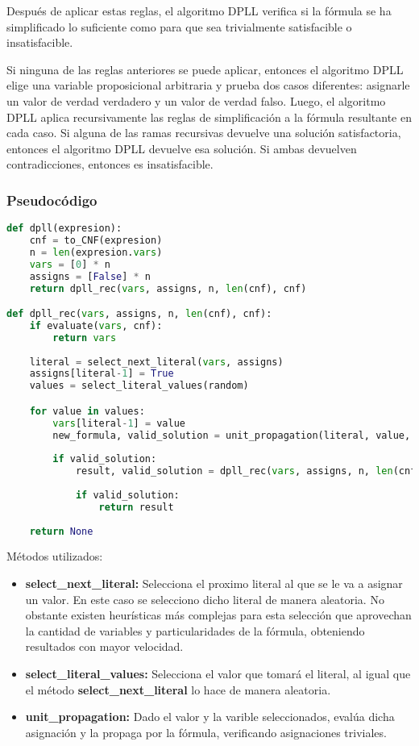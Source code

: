 \documentclass{article}
\begin{document}
        Después de aplicar estas reglas, el algoritmo DPLL verifica si la fórmula se ha simplificado lo suficiente como para que sea 
        trivialmente satisfacible o insatisfacible.  

        Si ninguna de las reglas anteriores se puede aplicar, entonces el algoritmo DPLL elige una variable proposicional 
        arbitraria y prueba dos casos diferentes: asignarle un valor de verdad verdadero y un valor de verdad falso.
        Luego, el algoritmo DPLL aplica recursivamente las reglas de simplificación a la fórmula resultante en cada caso. 
        Si alguna de las ramas recursivas devuelve una solución satisfactoria, entonces el algoritmo DPLL devuelve esa solución.
        Si ambas devuelven contradicciones, entonces es insatisfacible.

            \subsubsection*{Pseudocódigo}
\begin{lstlisting}[language=Python]
def dpll(expresion):
    cnf = to_CNF(expresion)
    n = len(expresion.vars)
    vars = [0] * n
    assigns = [False] * n
    return dpll_rec(vars, assigns, n, len(cnf), cnf)

def dpll_rec(vars, assigns, n, len(cnf), cnf):
    if evaluate(vars, cnf):
        return vars
    
    literal = select_next_literal(vars, assigns)
    assigns[literal-1] = True
    values = select_literal_values(random)

    for value in values:
        vars[literal-1] = value
        new_formula, valid_solution = unit_propagation(literal, value, vars, assigns, cnf)
    
        if valid_solution:
            result, valid_solution = dpll_rec(vars, assigns, n, len(cnf), new_formula)
            
            if valid_solution:
                return result
    
    return None
\end{lstlisting}

                Métodos utilizados:
                \begin{itemize}
                    \item \textbf{select\_next\_literal:} Selecciona el proximo literal al que se le va a asignar un valor. En este caso se selecciono
                    dicho literal de manera aleatoria. No obstante existen heurísticas más complejas para esta selección que aprovechan la cantidad de 
                    variables y particularidades de la fórmula, obteniendo resultados con mayor velocidad.
                    \item \textbf{select\_literal\_values:} Selecciona el valor que tomará el literal, al igual que el método
                     \textbf{select\_next\_literal} lo hace de manera aleatoria.
                    \item \textbf{unit\_propagation:} Dado el valor y la varible seleccionados, evalúa dicha asignación y la propaga por la fórmula, 
                    verificando asignaciones triviales.
                \end{itemize}
\end{document}
